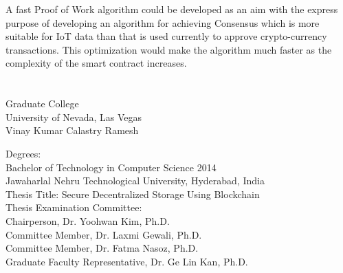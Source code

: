 \documentclass[11pt,openright]{report}
\begin{document}
A fast Proof of Work algorithm could be developed as an aim with the express purpose of developing an algorithm for achieving Consensus which is more suitable for IoT data than that is used currently to approve crypto-currency transactions. This optimization would make the algorithm much faster as the complexity of the smart contract increases.





\vita
\chapter{} %
\linespread{1.3} 
\begin{center}
Graduate College\\
University of Nevada, Las Vegas\\[1cm]
Vinay Kumar Calastry Ramesh\\[1cm]
\end{center}

\noindent Degrees:\\
\indent Bachelor of Technology in Computer Science 2014\\
\indent Jawaharlal Nehru Technological University, Hyderabad, India\\

\noindent Thesis Title: Secure Decentralized Storage Using Blockchain\\

\noindent Thesis Examination Committee:\\
\indent Chairperson, Dr. Yoohwan Kim, Ph.D.\\
\indent Committee Member, Dr. Laxmi Gewali, Ph.D.\\
\indent Committee Member, Dr. Fatma Nasoz, Ph.D.\\
\indent Graduate Faculty Representative, Dr. Ge Lin Kan, Ph.D.\\
\end{document}

